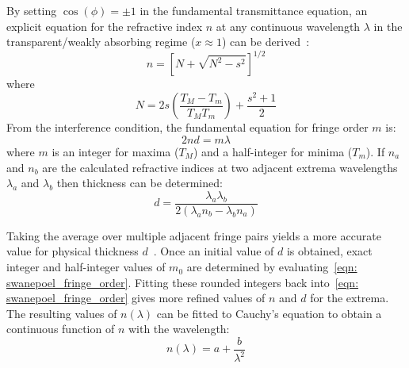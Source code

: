 By setting $\cos(\phi) = \pm 1$ in the fundamental transmittance equation, an explicit equation for the refractive index $n$ at any continuous wavelength $\lambda$ in the transparent/weakly absorbing regime ($x \approx 1$) can be derived~\cite{swanepoelDeterminationThicknessOptical1983}:
\begin{equation} \label{eqn: swanepoel_index}
	n = {\left[ N + \sqrt{N^2 - s^2} \right]}^{1/2}
\end{equation}
where
\begin{equation} \label{eqn: swanepoel_N}
	N = 2 s \left( \frac{T_M - T_m}{T_M T_m} \right) + \frac{s^2 + 1}{2}
\end{equation}
From the interference condition, the fundamental equation for fringe order $m$ is:
\begin{equation} \label{eqn: swanepoel_fringe_order}
	2 n d = m \lambda
\end{equation}
where $m$ is an integer for maxima ($T_M$) and a half-integer for minima ($T_m$). If $n_{a}$ and $n_{b}$ are the calculated refractive indices at two adjacent extrema wavelengths $\lambda_a$ and $\lambda_b$ then thickness can be determined:
\begin{equation} \label{eqn: swanepoel_thickness}
	d = \frac{\lambda_a \lambda_b}{2 (\lambda_a n_b - \lambda_b n_a)}
\end{equation}

Taking the average over multiple adjacent fringe pairs yields a more accurate value for physical thickness $d$~\cite{swanepoelDeterminationThicknessOptical1983, marquezOpticalconstantCalculationNonuniform1999}. Once an initial value of $d$ is obtained, exact integer and half-integer values of $m_0$ are determined by evaluating~\ref{eqn: swanepoel_fringe_order}. Fitting these rounded integers back into~\ref{eqn: swanepoel_fringe_order} gives more refined values of $n$ and $d$ for the extrema. The resulting values of $n(\lambda)$ can be fitted to Cauchy's equation to obtain a continuous function of $n$ with the wavelength:
\begin{equation} \label{eqn: sellmeier}
	n(\lambda) = a + \frac{b}{\lambda^2}
\end{equation}


